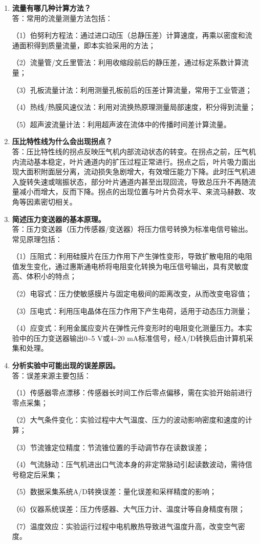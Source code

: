 \begin{enumerate}
    \item \textbf{流量有哪几种计算方法？}\\
    答：常用的流量测量方法包括：
    
    （1）伯努利方程法：通过进口动压（总静压差）计算速度，再乘以密度和流通面积得到质量流量，即本实验采用的方法；
    
    （2）流量管/文丘里管法：利用收缩段前后的静压差，通过标定系数计算流量；
    
    （3）孔板流量计法：利用测量孔板前后的压差计算流量，常用于工业管道；
    
    （4）热线/热膜风速仪法：利用对流换热原理测量局部速度，积分得到流量；
    
    （5）超声波流量计法：利用超声波在流体中的传播时间差计算流量。

    \item \textbf{压比特性线为什么会出现拐点？}\\
    答：压比特性线的拐点反映压气机内部流动状态的转变。在拐点之前，压气机内流动基本稳定，叶片通道内的扩压过程正常进行。拐点之后，叶片吸力面出现大面积附面层分离，流动损失急剧增大，有效增压能力下降。此时压气机进入旋转失速或喘振状态，部分叶片通道内甚至出现回流，导致总压升不再随流量减小而增大，反而下降。拐点的出现位置与叶片负荷水平、来流马赫数、攻角等因素密切相关。

    \item \textbf{简述压力变送器的基本原理。}\\
    答：压力变送器（压力传感器/变送器）将压力信号转换为标准电信号输出。常见原理包括：

    （1）压阻式：利用硅膜片在压力作用下产生弹性变形，导致扩散电阻的电阻值发生变化，通过惠斯通电桥将电阻变化转换为电压信号输出，具有灵敏度高、体积小的特点；
    
    （2）电容式：压力使敏感膜片与固定电极间的距离改变，从而改变电容值；
    
    （3）压电式：利用压电晶体在压力作用下产生电荷，适用于动态压力测量；
    
    （4）应变式：利用金属应变片在弹性元件变形时的电阻变化测量压力。本实验中的压力变送器输出0\textasciitilde5 V或4\textasciitilde20 mA标准信号，经A/D转换后由计算机采集和处理。

    \item \textbf{分析实验中可能出现的误差原因。}\\
    答：误差来源主要包括：
    
    （1）传感器零点漂移：传感器长时间工作后零点偏移，需在实验开始前进行零点采集；
    
    （2）大气条件变化：实验过程中大气温度、压力的波动影响密度和速度的计算；
    
    （3）节流锥定位精度：节流锥位置的手动调节存在读数误差；
    
    （4）气流脉动：压气机进出口气流本身的非定常脉动引起读数波动，需待信号稳定后采集；
    
    （5）数据采集系统A/D转换误差：量化误差和采样精度的影响；
    
    （6）仪器系统误差：压力传感器、大气压力计、温度计等自身精度有限；
    
    （7）温度效应：实验运行过程中电机散热导致进气温度升高，改变空气密度。
\end{enumerate}

